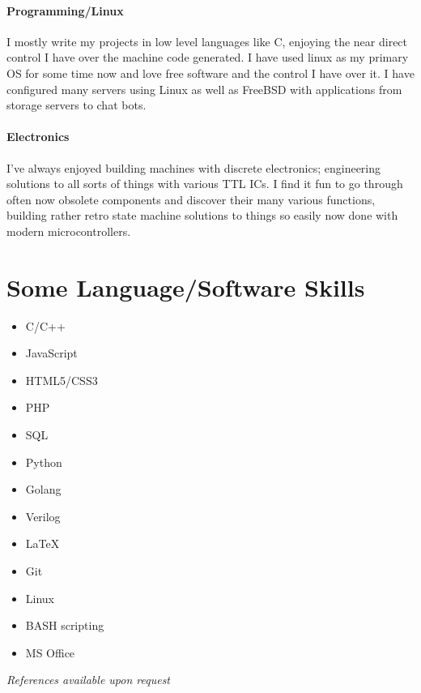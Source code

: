 \documentclass[9pt,a4paper]{article}
\begin{document}
\begin{multicols*}{2}
\paragraph{Programming/Linux} 
I mostly write my projects in low level languages like C, enjoying the near direct control I have over the machine code generated.
I have used linux as my primary OS for some time now and love free software and the control I have over it.
I have configured many servers using Linux as well as FreeBSD with applications from storage servers to chat bots.
\vspace*{-0.1cm}
\paragraph{Electronics} I've always enjoyed building machines with discrete electronics;
engineering solutions to all sorts of things with various TTL ICs.
I find it fun to go through often now obsolete components and discover their many various functions, building rather retro state machine solutions to things so easily now done with modern microcontrollers.

\section*{Some Language/Software Skills}
\begin{multicols*}{2}
\begin{itemize}
\item C/C++
\item JavaScript
\item HTML5/CSS3
\item PHP
\item SQL
\item Python
\item Golang
\item Verilog
\item \LaTeX 
\item Git
\item Linux
\item BASH scripting
\item MS Office
\end{itemize}
\end{multicols*}
\vfill
\textit{References available upon request}
\end{multicols*}
\end{document}
